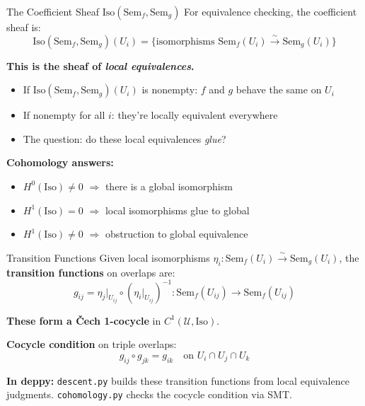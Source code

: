 \documentclass[aspectratio=169,10pt]{beamer}
\newcommand{\Uscr}{\mathcal{U}}
\newcommand{\Iso}{\mathrm{Iso}}
\newcommand{\Sem}{\mathrm{Sem}}
\begin{document}
\begin{frame}{The Coefficient Sheaf $\Iso(\Sem_f, \Sem_g)$}
For equivalence checking, the coefficient sheaf is:
\[
\Iso(\Sem_f, \Sem_g)(U_i) = \{\text{isomorphisms } \Sem_f(U_i) \xrightarrow{\sim} \Sem_g(U_i)\}
\]

\textbf{This is the sheaf of \emph{local equivalences}.}

\begin{itemize}
  \item If $\Iso(\Sem_f, \Sem_g)(U_i)$ is nonempty: $f$ and $g$ behave the same on $U_i$
  \item If nonempty for all $i$: they're locally equivalent everywhere
  \item The question: do these local equivalences \emph{glue}?
\end{itemize}

\textbf{Cohomology answers:}
\begin{itemize}
  \item $H^0(\Iso) \neq 0$ $\Rightarrow$ there is a global isomorphism
  \item $H^1(\Iso) = 0$ $\Rightarrow$ local isomorphisms glue to global
  \item $H^1(\Iso) \neq 0$ $\Rightarrow$ obstruction to global equivalence
\end{itemize}
\end{frame}

\begin{frame}{Transition Functions}
Given local isomorphisms $\eta_i : \Sem_f(U_i) \xrightarrow{\sim} \Sem_g(U_i)$, the \textbf{transition functions} on overlaps are:
\[
g_{ij} = \eta_j|_{U_{ij}} \circ (\eta_i|_{U_{ij}})^{-1} : \Sem_f(U_{ij}) \to \Sem_f(U_{ij})
\]

\textbf{These form a \v{C}ech 1-cocycle} in $C^1(\Uscr, \Iso)$.

\vspace{0.3em}
\textbf{Cocycle condition} on triple overlaps:
\[
g_{ij} \circ g_{jk} = g_{ik} \quad\text{on } U_i \cap U_j \cap U_k
\]

\textbf{In deppy:} \texttt{descent.py} builds these transition functions from local equivalence judgments. \texttt{cohomology.py} checks the cocycle condition via SMT.
\end{frame}
\end{document}
